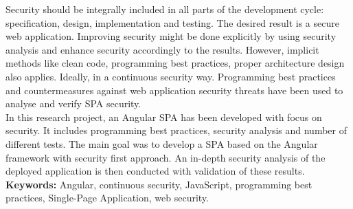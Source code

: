 \documentclass{article} %
\begin{document}
Security should be integrally included in all parts of the development cycle: specification, design, implementation and testing. The desired result is a secure web application. Improving security might be done explicitly by using security analysis and enhance security accordingly to the results. However, implicit methods like clean code, programming best practices, proper architecture design also applies. Ideally, in a continuous security way. Programming best practices and countermeasures against web application security threats have been used to analyse and verify SPA security.\\
\newline
In this research project, an Angular SPA has been developed with focus on security. It includes programming best practices, security analysis and number of different tests. The main goal was to develop a SPA based on the Angular framework with security first approach. An in-depth security analysis of the deployed application is then conducted with validation of these results.
\bigskip \\
\textbf{Keywords:} Angular, continuous security, JavaScript, programming best practices, Single-Page Application, web security.
\newpage
{} %
\end{document}
